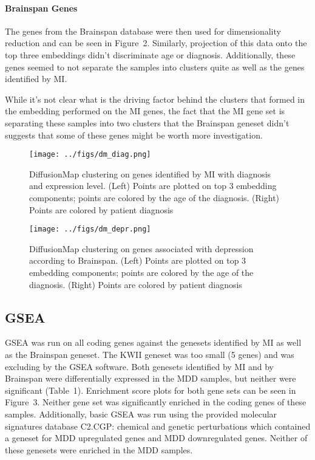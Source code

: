 \documentclass{bioinfo}
\begin{document}
\paragraph{Brainspan Genes} The genes from the Brainspan database were then used for dimensionality reduction and can be seen in Figure~2\vphantom{\ref{fig:02}}.  Similarly, projection of this data onto the top three embeddings didn't discriminate age or diagnosis.  Additionally, these genes seemed to not separate the samples into clusters quite as well as the genes identified by MI.

While it's not clear what is the driving factor behind the clusters that formed in the embedding performed on the MI genes, the fact that the MI gene set is separating these samples into two clusters that the Brainspan geneset didn't suggests that some of these genes might be worth more investigation.
\begin{figure*}[tbp!]%
    \centering
    \texttt{[image: ../figs/dm\_diag.png]}
        \caption{DiffusionMap clustering on genes identified by MI with diagnosis and expression level.  (Left) Points are plotted on top 3 embedding components; points are colored by the age of the diagnosis. (Right) Points are colored by patient diagnosis}\label{fig:01}
    \end{figure*}
\begin{figure*}[tbp!]%
    \centering
    \texttt{[image: ../figs/dm\_depr.png]}
    \caption{DiffusionMap clustering on genes associated with depression according to Brainspan.  (Left) Points are plotted on top 3 embedding components; points are colored by the age of the diagnosis. (Right) Points are colored by patient diagnosis}\label{fig:02}
\end{figure*}
\clearpage
\subsection{GSEA}
GSEA was run on all coding genes against the genesets identified by MI as well as the Brainspan geneset.  The KWII geneset was too small (5 genes) and was excluding by the GSEA software.  Both genesets identified by MI and by Brainspan were differentially expressed in the MDD samples, but neither were significant (Table~1\vphantom{\ref{Tab:01}}).  Enrichment score plots for both gene sets can be seen in Figure~3\vphantom{\ref{fig:03}}.  Neither gene
set was significantly enriched in the coding genes of these samples.  Additionally, basic GSEA was run using the provided molecular signatures database C2.CGP: chemical and genetic perturbations which contained a geneset for MDD upregulated genes and MDD downregulated genes.  Neither of these genesets were enriched in the MDD samples.
\end{document}
